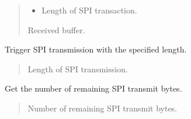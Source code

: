 \documentclass[letterpaper,10pt,english]{sphinxmanual}
\begin{document}
\begin{fulllineitems}
\begin{fulllineitems}
\begin{quote}
\begin{description}
\begin{itemize}
\item {} 
\sphinxAtStartPar
{} \textendash{} Length of SPI transaction.

\end{itemize}

\sphinxAtStartPar
Received buffer.

\end{description}\end{quote}

\end{fulllineitems}


\begin{fulllineitems}
\label{\detokenize{cplddocs:management_flash.MngProgFlash.spi_trigger}}
\pysigstartsignatures
{}
\pysigstopsignatures
\sphinxAtStartPar
Trigger SPI transmission with the specified length.
\begin{quote}\begin{description}
\sphinxAtStartPar
{} \textendash{} Length of SPI transmission.

\end{description}\end{quote}

\end{fulllineitems}


\begin{fulllineitems}
\label{\detokenize{cplddocs:management_flash.MngProgFlash.spi_tx_remaining}}
\pysigstartsignatures
{}
\pysigstopsignatures
\sphinxAtStartPar
Get the number of remaining SPI transmit bytes.
\begin{quote}\begin{description}
\sphinxAtStartPar
Number of remaining SPI transmit bytes.

\end{description}\end{quote}

\end{fulllineitems}


\end{fulllineitems}
\end{document}
